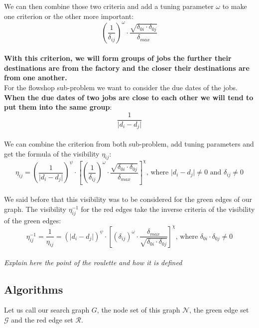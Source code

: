 \documentclass[UTF8, twoside]{EPURapport}
\begin{document}
	We can then combine those two criteria and add a tuning parameter $\omega$ to make one criterion or the other more important: 
\\

\[
\left(\frac{1}{\delta_{ij}}\right)^\omega \cdot \frac{\sqrt{\delta_{0i} \cdot \delta_{0j}}}{\delta_{max}}
\]
\\

\textbf{With this criterion, we will form groups of jobs the further their destinations are from the factory and the closer their destinations are from one another.}
\\

	For the flowshop sub-problem we want to consider the due dates of the jobs. \textbf{When the due dates of two jobs are close to each other we will tend to put them into the same group}: 
\\

\[
\frac{1}{\vert d_i - d_j \vert}
\]
\\

	We can combine the criterion from both sub-problem, add tuning parameters and get the formula of the visibility $\eta_{ij}$:
\\

\[
\eta_{ij} = 
\left( \frac{1}{\vert d_i - d_j \vert} \right)^\psi \cdot \left[\left(\frac{1}{\delta_{ij}}\right)^\omega \cdot \frac{\sqrt{\delta_{0i} \cdot \delta_{0j}}}{\delta_{max}} \right]^\chi \text{, where } \vert d_i - d_j \vert \neq 0 \text{ and } \delta_{ij} \neq 0
\]
\\

	We said before that this visibility was to be considered for the green edges of our graph. The visibility $\eta_{ij}^{-1}$ for the red edges take the inverse criteria of the visibility of the green edges:
\\

\[
\eta_{ij}^{-1} = \frac{1}{\eta_{ij}} =
\left( \vert d_i - d_j \vert \right)^\psi \cdot \left[\left(\delta_{ij}\right)^\omega \cdot \frac{\delta_{max}}{\sqrt{\delta_{0i} \cdot \delta_{0j}}} \right]^\chi \text{, where } \delta_{0i} \cdot \delta_{0j} \neq 0 
\]
\\
	
\textit{Explain here the point of the roulette and how it is defined}

\subsection{Algorithms}

	Let us call our search graph $G$, the node set of this graph $\mathscr{N}$, the green edge set $\mathscr{G}$ and the red edge set $\mathscr{R}$. 
\end{document}
